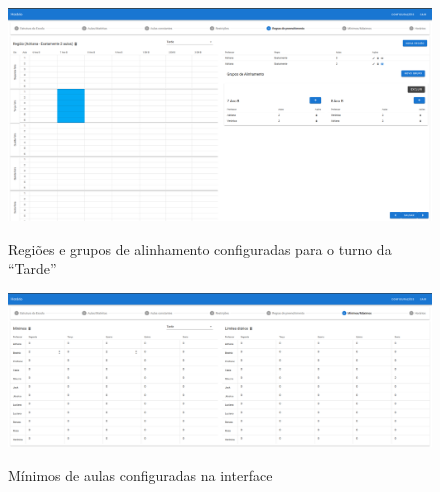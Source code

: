 \begin{figure}
	\centering
	\caption{Regiões e grupos de alinhamento configuradas para o turno da ``Tarde''}
	\includegraphics[width=1\textwidth]{./dados/figuras/regioes_configuradas_tarde}
	\label{fig:regioes_configuradas_tarde}
\end{figure}

\begin{figure}
	\centering
	\caption{Mínimos de aulas configuradas na interface}
	\includegraphics[width=1\textwidth]{./dados/figuras/minimos_configurados}
	\label{fig:minimos_configurados}
\end{figure}
\pagebreak

